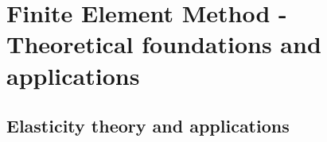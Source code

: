 \chapter{ Finite Element Method - Theoretical foundations and applications} %

\label{Chapter2} %


\section{Elasticity theory and applications}
